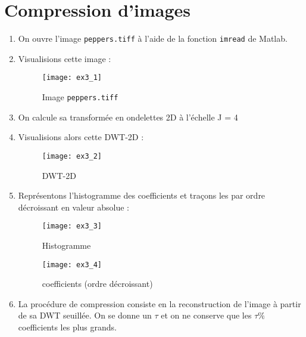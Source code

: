 \documentclass[12pt,a4paper,titlepage]{article}
\begin{document}
    \section{Compression d'images}

    \begin{enumerate}

        \item{On ouvre l'image \texttt{peppers.tiff} à l'aide de la fonction
                \texttt{imread} de Matlab.
            }

        \item{
                Visualisions cette image :

                \begin{figure}[H]
                    \caption{Image \texttt{peppers.tiff}}
                    \texttt{[image: ex3\_1]}
                    \centering
                \end{figure}
            }

        \item{On calcule sa transformée en ondelettes 2D à l'échelle J = 4}

        \item{Visualisions alors cette DWT-2D :

                \begin{figure}[H]
                    \caption{DWT-2D}
                    \texttt{[image: ex3\_2]}
                    \centering
                \end{figure}
            }

        \item{Représentons l'histogramme des coefficients et traçons les par
                ordre décroissant en valeur absolue :

                \begin{figure}[H]
                    \caption{Histogramme}
                    \texttt{[image: ex3\_3]}
                    \centering
                \end{figure}

                \begin{figure}[H]
                    \caption{coefficients (ordre décroissant)}
                    \texttt{[image: ex3\_4]}
                    \centering
                \end{figure}

            }

        \item{{La procédure de compression consiste en la reconstruction de l'image à partir de sa DWT
                seuillée. On se donne un $\tau$ et on ne conserve que les $\tau \%$ coefficients
                les plus grands.
            }

}
\end{enumerate}
\end{document}
